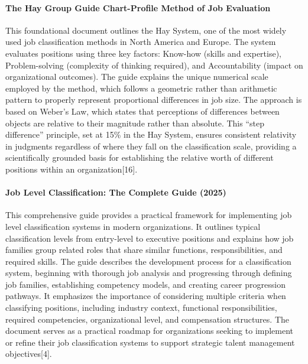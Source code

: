 \documentclass[./main.tex]{subfiles}
\begin{document}
\paragraph{The Hay Group Guide Chart-Profile Method of Job
Evaluation}\label{the-hay-group-guide-chart-profile-method-of-job-evaluation}

This foundational document outlines the Hay System, one of the most
widely used job classification methods in North America and Europe. The
system evaluates positions using three key factors: Know-how (skills and
expertise), Problem-solving (complexity of thinking required), and
Accountability (impact on organizational outcomes). The guide explains
the unique numerical scale employed by the method, which follows a
geometric rather than arithmetic pattern to properly represent
proportional differences in job size. The approach is based on Weber's
Law, which states that perceptions of differences between objects are
relative to their magnitude rather than absolute. This ``step
difference'' principle, set at 15\% in the Hay System, ensures
consistent relativity in judgments regardless of where they fall on the
classification scale, providing a scientifically grounded basis for
establishing the relative worth of different positions within an
organization{[}16{]}.

\paragraph{Job Level Classification: The Complete Guide
(2025)}\label{job-level-classification-the-complete-guide-2025}

This comprehensive guide provides a practical framework for implementing
job level classification systems in modern organizations. It outlines
typical classification levels from entry-level to executive positions
and explains how job families group related roles that share similar
functions, responsibilities, and required skills. The guide describes
the development process for a classification system, beginning with
thorough job analysis and progressing through defining job families,
establishing competency models, and creating career progression
pathways. It emphasizes the importance of considering multiple criteria
when classifying positions, including industry context, functional
responsibilities, required competencies, organizational level, and
compensation structures. The document serves as a practical roadmap for
organizations seeking to implement or refine their job classification
systems to support strategic talent management objectives{[}4{]}.
\end{document}
